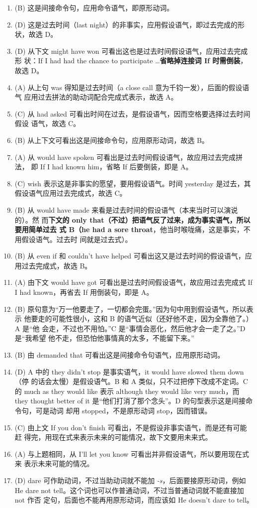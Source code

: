 \begin{enumerate}
\item (B) 这是间接命令句，应用命令语气，即原形动词。
\item (D) 这是过去时间（last night）的非事实，应用假设语气，即过去完成的形状，故选 D。
\item (D) 从下文 might have won 可看出这也是过去时间假设语气，应用过去完成形
  状：If I had had the chance to participate \ldots \textbf{省略掉连接词 If 时需倒装}，
  故选 D。

\item (A) 从上句 was 得知是过去时间（a close call 意为千钧一发），后面的假设语气
  应用过去拼法的助动词配合完成式表示，故选 A。
\item (C) 从 had asked 可看出时间在过去，是假设语气，因而空格要选择过去时间假设
  语气，故选 C。
\item (B) 从上下文可看出这是间接命令句，应用原形动词，故选 B。
\item (A) 从 would have spoken 可看出是过去时间假设语气，故应用过去完成拼法，
  即 If I had known him，省略 If 后要倒装，即是 A。
\item (C) wish 表示这是非事实的愿望，要用假设语气。时间 yesterday 是过去，其假设语气应用过去完成式，故选 C。

\item (B) 从 would have made 来看是过去时间的假设语气（本来当时可以演说的）。然
  而\textbf{下文的 only that（不过）把语气反了过来，成为事实语气，所以要用简单过去
    式 B（he had a sore throat}，他当时喉咙痛，这是事实，不用假设语气。过去时
  间就是过去式）。
\item (B) 从 even if 和 couldn't have helped 可看出这又是过去时间的假设语气，应
  用过去完成式，故选 B。
\item (A) 由下文 would have got 可看出是过去时间假设语气，故应用过去完成式 If I
  had known，再省去 If 用倒装句，即是 A。
\item (B) 原句意为“万一他要走了，一切都会完蛋。”因为句中用到假设语气，所以表示
  他要走的可能性很小，这和 B 的语气近似（还好他不走，因为全靠他了。）A 是“他
  会走，不过也不用怕。”C 是“事情会恶化，然后他才会一走了之。”D 是“我希望
  他不走，但恐怕他事情真的太多，不能留下来。”
\item (B) 由 demanded that 可看出这是间接命令句语气，应用原形动词。
\item (D) A 中的 they didn't stop 是事实语气，it would have slowed them down（停
  的话会太慢）是假设语气。B 和 A 类似，只不过把停下改成不定词。C 的 much as
  they would like 表示 although they would like very much，而 they thought
  better of it 是“他们打消了那个念头”。D 的句型表示这是间接命令句，可是动词
  却用 stopped，不是原形动词 stop，因而错误。
\item (C) 由上文 If you don't finish 可看出，不是假设非事实语气，而是还有可能赶
  得完，用现在式来表示未来的可能情况，故下文要用未来式。
\item (A) 与上题相同，从 I'll let you know 可看出并非假设语气，所以要用现在式来
  表示未来可能的情况。
\item (D) dare 可作助动词，不过当助动词就不能加 \emph{-s}，后面要接原形动词，例如 He
  dare not tell。这个词也可以作普通动词，不过当普通动词就不能直接加 not 作否
  定句，后面也不能再用原形动词，而应该如 He doesn't dare to tell。


\end{enumerate}

